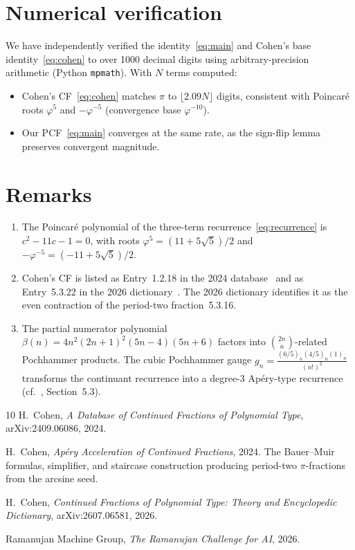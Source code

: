 \documentclass[11pt]{article}
\begin{document}
\section{Numerical verification}

We have independently verified the identity~\eqref{eq:main}
and Cohen's base identity~\eqref{eq:cohen} to over 1000
decimal digits using arbitrary-precision arithmetic (Python
\texttt{mpmath}). With $N$ terms computed:
\begin{itemize}
\item Cohen's CF~\eqref{eq:cohen} matches $\pi$ to
  $\lfloor 2.09 N \rfloor$ digits, consistent with Poincar\'e
  roots $\varphi^5$ and $-\varphi^{-5}$ (convergence base
  $\varphi^{-10}$).
\item Our PCF~\eqref{eq:main} converges at the same rate,
  as the sign-flip lemma preserves convergent magnitude.
\end{itemize}

\section{Remarks}

\begin{enumerate}
\item The Poincar\'e polynomial of the three-term
  recurrence~\eqref{eq:recurrence} is $c^2 - 11c - 1 = 0$,
  with roots $\varphi^5 = (11 + 5\sqrt{5})/2$ and
  $-\varphi^{-5} = (-11 + 5\sqrt{5})/2$.

\item Cohen's CF is listed as Entry~1.2.18 in the 2024
  database~\cite{Cohen2024} and as Entry~5.3.22 in the 2026
  dictionary~\cite{Cohen2026}. The 2026 dictionary identifies
  it as the even contraction of the period-two
  fraction~5.3.16.

\item The partial numerator polynomial $\beta(n) =
  4n^2(2n+1)^2(5n-4)(5n+6)$ factors into
  $\binom{2n}{n}$-related Pochhammer products. The cubic
  Pochhammer gauge $g_n = \frac{(6/5)_n (4/5)_n (1)_n}{(n!)^2}$
  transforms the continuant recurrence into a degree-3
  Ap\'ery-type recurrence (cf.~\cite{Cohen2026}, Section~5.3).
\end{enumerate}

\begin{thebibliography}{10}
H.~Cohen,
\emph{A Database of Continued Fractions of Polynomial Type},
arXiv:2409.06086, 2024.

H.~Cohen,
\emph{Ap\'ery Acceleration of Continued Fractions},
2024.
The Bauer--Muir formulas, simplifier, and staircase construction
producing period-two $\pi$-fractions from the arcsine seed.

H.~Cohen,
\emph{Continued Fractions of Polynomial Type: Theory and
  Encyclopedic Dictionary},
arXiv:2607.06581, 2026.

Ramanujan Machine Group,
\emph{The Ramanujan Challenge for AI}, 2026.
\end{thebibliography}
\end{document}
